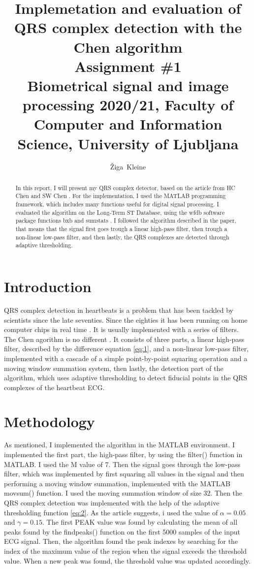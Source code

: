 \documentclass[9pt]{IEEEtran}
\title{\vspace{0ex} %
Implemetation and evaluation of QRS complex detection with the Chen algorithm
\\ \large{Assignment \#1}\\ \normalsize{Biometrical signal and image processing 2020/21, Faculty of Computer and Information Science, University of Ljubljana}}
\author{ %
Žiga~Kleine
\vspace{-4.0ex}
}
\begin{document}
\maketitle

\begin{abstract}

In this report, I will present my QRS complex detector, based on the article from HC Chen and SW Chen \cite{chen2003moving}. For the implementation, I used the MATLAB programming framework, which includes many functions useful for digital signal processing. I evaluated the algorithm on the Long-Term ST Database, using the wfdb software package functions bxb and sumstats \cite{jager2003long, goldberger2000physiobank}. I followed the algorithm described in the paper, that means that the signal first goes trough a linear high-pass filter, then trough a non-linear low-pass filter, and then lastly, the QRS complexes are detected through adaptive thresholding.

\end{abstract}

\section{Introduction}

QRS complex detection in heartbeats is a problem that has been tackled by scientists since the late seventies. Since the eighties it has been running on home computer chips in real time \cite{pan1985real}. It is usually implemented with a series of filters.
The Chen agorithm is no different \cite{chen2003moving}. It consists of three parts, a linear high-pass filter, described by the difference equation \ref{eq:1},  and a non-linear low-pass filter, implemented with a cascade of a simple
point-by-point squaring operation and a moving window summation system, then lastly, the detection part of the algorithm, which uses adaptive thresholding to detect fiducial points in the QRS complexes of the heartbeat ECG.

\section{Methodology}

As mentioned, I implemented the algorithm in the MATLAB environment. I implemented the first part, the high-pass filter, by using the filter() function in MATLAB. I used the M value of 7. Then the signal goes through the low-pass filter, which was implemented by first squaring all values in the signal and then performing a moving window summation, implemented with the MATLAB movsum() function. I used the moving summation window of size 32. Then the QRS complex detection was implemented with the help of the adaptive thresholding function \ref{eq:2}. As the article suggests, i used the value of  $ \alpha  = 0.05 $ and  $ \gamma = 0.15 $. The first PEAK value was found by calculating the mean of all peaks found by the findpeaks() function on the first 5000 samples of the input ECG signal. Then, the algorithm found the peak indexes by searching for the index of the maximum value of the region when the signal exceeds the threshold value. When a new peak was found, the threshold value was updated accordingly. 
\end{document}
